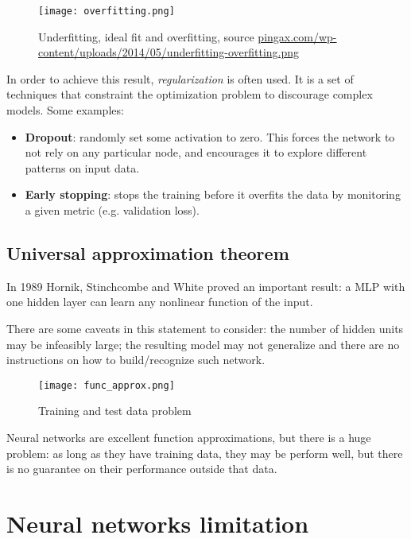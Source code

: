 \begin{figure}
  \centering
  \texttt{[image: overfitting.png]}
  \caption{Underfitting, ideal fit and overfitting, source \url{pingax.com/wp-content/uploads/2014/05/underfitting-overfitting.png}}
  \label{fig:overfitting}
\end{figure}

In order to achieve this result, \textit{regularization} is often used. It is a set of techniques that constraint the optimization problem to discourage complex models. Some examples:

\begin{itemize}
 \item \textbf{Dropout}: randomly set some activation to zero. This forces the
network to not rely on any particular node, and encourages it to explore
different patterns on input data.
 \item \textbf{Early stopping}: stops the training before it overfits the data
by monitoring a given metric (e.g. validation loss).
\end{itemize}

\subsection{Universal approximation theorem}

In 1989 Hornik, Stinchcombe and White proved an important result: a MLP with one hidden layer can learn any nonlinear function of the input.

There are some caveats in this statement to consider: the number of hidden units may be infeasibly large; the resulting model may not generalize and there are no instructions on how to build/recognize such network.

\begin{figure}[H]
  \centering
  \texttt{[image: func\_approx.png]}
  \caption{Training and test data problem}
  \label{fig:hist_ex}
\end{figure}

Neural networks are excellent function approximations, but there is a huge
problem: as long as they have training data, they may be perform well, but
there is no guarantee on their performance outside that data.

\section{Neural networks limitation}

